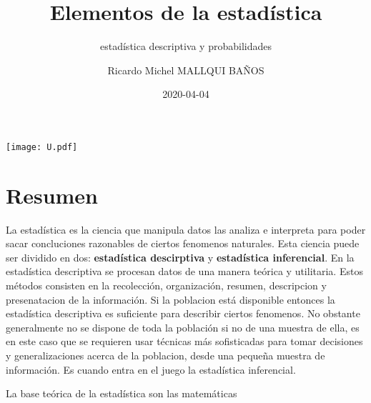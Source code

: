 \documentclass[10pt,]{krantz}
\title{Elementos de la estadística}
\subtitle{estadística descriptiva y probabilidades}
\author{Ricardo Michel MALLQUI BAÑOS}
\date{2020-04-04}
\let\oldincludegraphics\includegraphics
\renewcommand\includegraphics[2][]{%
  \oldincludegraphics[scale=0.85]{#2}
}
\theoremstyle{definition}
\theoremstyle{definition}
\theoremstyle{definition}
\theoremstyle{remark}
\begin{document}
\maketitle

\thispagestyle{empty}
\begin{center}
\texttt{[image: U.pdf]}
\end{center}


{
\hypersetup{linkcolor=}
\setcounter{tocdepth}{2}
\tableofcontents
}
\listoftables
\listoffigures
\newcommand{\N}{\mathbb{N}}
\newcommand{\R}{\mathbb{R}}
\newcommand{\CC}{\mathbb{C}}
\newcommand{\I}{\mathbb{I}}
\newcommand{\f}{\mathbb{f}}
\newcommand{\X}{\mathbb{X}}
\newcommand{\D}{\mathbb{D}}
\newcommand{\Z}{\mathbb{Z}}
\newcommand{\Q}{\mathbb{Q}}
\newcommand{\norm}[1]{\left\Vert#1\right\Vert}
\newcommand{\abs}[1]{\left\vert#1\right\vert}
\newcommand{\set}[1]{\left\{#1\right\}}
\newcommand{\seq}[1]{\left<#1\right>}
\newcommand{\co}[1]{\left[#1\right]}
\newcommand{\cc}[1]{\left(#1\right)}
\newcommand{\J}{\mathcal{J}}
\newcommand{\K}{\mathcal{K}}
\newcommand{\M}{\mathcal{M}}
\newcommand{\F}{\mathcal{F}}

\hypertarget{resumen}{%
\chapter*{Resumen}\label{resumen}}


La estadística es la ciencia que manipula datos las analiza e interpreta para poder sacar concluciones razonables de ciertos fenomenos naturales. Esta ciencia puede ser dividido en dos: \textbf{estadística descirptiva} y \textbf{estadística inferencial}. En la estadística descriptiva se procesan datos de una manera teórica y utilitaria. Estos métodos consisten en la recolección, organización, resumen, descripcion y presenatacion de la información. Si la poblacion está disponible entonces la estadística descriptiva es suficiente para describir ciertos fenomenos. No obstante generalmente no se dispone de toda la población si no de una muestra de ella, es en este caso que se requieren usar técnicas más sofisticadas para tomar decisiones y generalizaciones acerca de la poblacion, desde una pequeña muestra de información. Es cuando entra en el juego la estadística inferencial.

La base teórica de la estadística son las matemáticas
\end{document}
